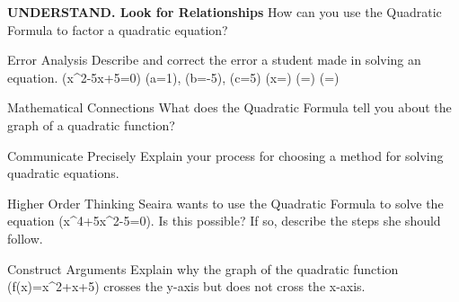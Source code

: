 \documentclass{article}
\newenvironment{practice}[2]{}{}        %
\newcommand{\answer}[1]{}               %
\newcommand{\te}[1]{}                   %
\begin{document}
\begin{practice}{9}{2}
\textbf{UNDERSTAND. Look for Relationships} How can you use the Quadratic Formula to factor a quadratic equation?
\answer{Sample: The Quadratic Formula provides the solutions of the equation. If c and d are solutions of a quadratic equation, then the quadratic expression can be factored as (a(x-c)(x-d)).}
\end{practice}
\begin{practice}{10}{2}
Error Analysis Describe and correct the error a student made in solving an equation.
(x^2-5x+5=0)
(a=1), (b=-5), (c=5)
(x=)
(=)
(=\pm{})
\te{The displayed student work is marked with a red X. Printed final line changes -5 to +5, matching the correct answer despite incorrect preceding steps.}
\answer{The student used b, not -b, in the numerator of the Quadratic Formula; the correct answer is (\frac{5}{2}\pm\frac{\sqrt{5}}{2}).}
\end{practice}
\begin{practice}{11}{1}
Mathematical Connections What does the Quadratic Formula tell you about the graph of a quadratic function?
\answer{The Quadratic Formula tells you whether the graph of a quadratic function crosses the x-axis and, if it does, where the x-intercepts are.}
\end{practice}
\begin{practice}{12}{2}
Communicate Precisely Explain your process for choosing a method for solving quadratic equations.
\answer{I first look to see if the quadratic expression has a special form like a perfect square or difference of squares. I next check to see if it is easily factored. If the coefficient of x is even, I consider completing the square. If I am not able to factor quickly, I will use the Quadratic Formula.}
\end{practice}
\begin{practice}{13}{3}
Higher Order Thinking Seaira wants to use the Quadratic Formula to solve the equation (x^4+5x^2-5=0). Is this possible? If so, describe the steps she should follow.
\answer{Seaira can use the Quadratic Formula with (a=1), (b=5), and (c=-5) to find values for (x^2) that solve the equation. The square roots of these values will solve the original equation.}
\end{practice}
\begin{practice}{14}{2}
Construct Arguments Explain why the graph of the quadratic function (f(x)=x^2+x+5) crosses the y-axis but does not cross the x-axis.
\answer{The discriminant is (b^2-4ac=-19), so there are no real solutions. There is no real number x such that (f(x)=0), so the graph will not cross the x-axis. The domain of the function is all real numbers, so must include (x=0); the graph intersects the y-axis at (0,5).}
\end{practice}
\end{document}
